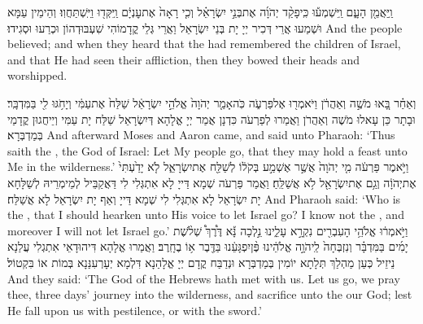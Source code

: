 {וַֽיַּאֲמֵ֖ן הָעָ֑ם וַֽיִּשְׁמְע֡וּ כִּֽי\maqqaf פָקַ֨ד יְהֹוָ֜ה אֶת\maqqaf בְּנֵ֣י יִשְׂרָאֵ֗ל וְכִ֤י רָאָה֙ אֶת\maqqaf עׇנְיָ֔ם וַֽיִּקְּד֖וּ וַיִּֽשְׁתַּחֲוֽוּ׃}
{וְהֵימֵין עַמָּא וּשְׁמַעוּ אֲרֵי דְּכִיר יְיָ יָת בְּנֵי יִשְׂרָאֵל וַאֲרֵי גְּלֵי קֳדָמוֹהִי שִׁעְבּוּדְהוֹן וּכְרַעוּ וּסְגִידוּ׃}
{And the people believed; and when they heard that the \lord\space had remembered the children of Israel, and that He had seen their affliction, then they bowed their heads and worshipped.}{}

\newperek
{}
{וְאַחַ֗ר בָּ֚אוּ מֹשֶׁ֣ה וְאַהֲרֹ֔ן וַיֹּאמְר֖וּ אֶל\maqqaf פַּרְעֹ֑ה כֹּֽה\maqqaf אָמַ֤ר יְהֹוָה֙ אֱלֹהֵ֣י יִשְׂרָאֵ֔ל שַׁלַּח֙ אֶת\maqqaf עַמִּ֔י וְיָחֹ֥גּוּ לִ֖י בַּמִּדְבָּֽר׃}
{וּבָתָר כֵּן עָאלוּ מֹשֶׁה וְאַהֲרֹן וַאֲמַרוּ לְפַרְעֹה כִּדְנָן אֲמַר יְיָ אֱלָהָא דְּיִשְׂרָאֵל שַׁלַּח יָת עַמִּי וְיֵיחֲגוּן קֳדָמַי בְּמַדְבְּרָא׃}
{And afterward Moses and Aaron came, and said unto Pharaoh: ‘Thus saith the \lord, the God of Israel: Let My people go, that they may hold a feast unto Me in the wilderness.’}{}
{וַיֹּ֣אמֶר פַּרְעֹ֔ה מִ֤י יְהֹוָה֙ אֲשֶׁ֣ר אֶשְׁמַ֣ע בְּקֹל֔וֹ לְשַׁלַּ֖ח אֶת\maqqaf יִשְׂרָאֵ֑ל לֹ֤א יָדַ֙עְתִּי֙ אֶת\maqqaf יְהֹוָ֔ה וְגַ֥ם אֶת\maqqaf יִשְׂרָאֵ֖ל לֹ֥א אֲשַׁלֵּֽחַ׃}
{וַאֲמַר פַּרְעֹה שְׁמָא דַּייָ לָא אִתְגְּלִי לִי דַּאֲקַבֵּיל לְמֵימְרֵיהּ לְשַׁלָּחָא יָת יִשְׂרָאֵל לָא אִתְגְּלִי לִי שְׁמָא דַּייָ וְאַף יָת יִשְׂרָאֵל לָא אֲשַׁלַּח׃}
{And Pharaoh said: ‘Who is the \lord, that I should hearken unto His voice to let Israel go? I know not the \lord, and moreover I will not let Israel go.’}{}
{וַיֹּ֣אמְר֔וּ אֱלֹהֵ֥י הָעִבְרִ֖ים נִקְרָ֣א עָלֵ֑ינוּ נֵ֣לְכָה נָּ֡א דֶּ֩רֶךְ֩ שְׁלֹ֨שֶׁת יָמִ֜ים בַּמִּדְבָּ֗ר וְנִזְבְּחָה֙ לַֽיהֹוָ֣ה אֱלֹהֵ֔ינוּ פֶּ֨ן\maqqaf יִפְגָּעֵ֔נוּ בַּדֶּ֖בֶר א֥וֹ בֶחָֽרֶב׃}
{וַאֲמַרוּ אֱלָהָא דִּיהוּדָאֵי אִתְגְלִי עֲלַנָא נֵיזֵיל כְּעַן מַהְלַךְ תְּלָתָא יוֹמִין בְּמַדְבְּרָא וּנְדַבַּח קֳדָם יְיָ אֱלָהַנָא דִּלְמָא יְעָרְעִנַּנָא בְּמוֹת אוֹ בִּקְטוֹל׃}
{And they said: ‘The God of the Hebrews hath met with us. Let us go, we pray thee, three days’ journey into the wilderness, and sacrifice unto the \lord\space our God; lest He fall upon us with pestilence, or with the sword.’}{}
